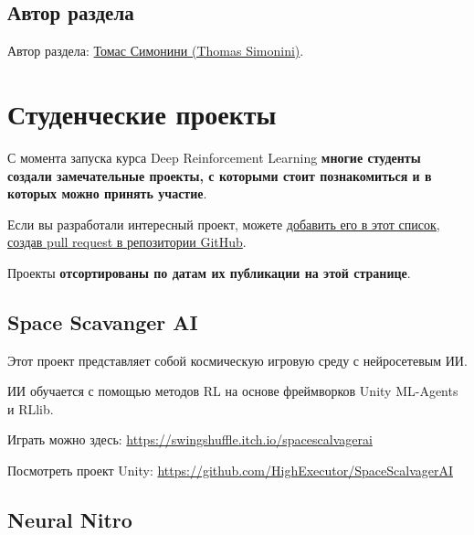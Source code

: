 \documentclass[11pt,a4paper]{article}
\begin{document}
\subsection{Автор раздела}\label{author-8}

Автор раздела: \href{https://twitter.com/ThomasSimonini}{Томас Симонини (Thomas Simonini)}.

\section{Студенческие проекты}\label{student-works}

С момента запуска курса Deep Reinforcement Learning \textbf{многие студенты создали замечательные проекты, с которыми стоит познакомиться и в которых можно принять участие}.

Если вы разработали интересный проект, можете \href{https://github.com/huggingface/deep-rl-class}{добавить его в этот список, создав pull request в репозитории GitHub}.

Проекты \textbf{отсортированы по датам их публикации на этой странице}.

\subsection{Space Scavanger AI}\label{space-scavanger-ai}

Этот проект представляет собой космическую игровую среду с нейросетевым ИИ.

ИИ обучается с помощью методов RL на основе фреймворков Unity ML-Agents и RLlib.


Играть можно здесь: \url{https://swingshuffle.itch.io/spacescalvagerai}

Посмотреть проект Unity: \url{https://github.com/HighExecutor/SpaceScalvagerAI}

\subsection{Neural Nitro}\label{neural-nitro}

\end{document}
